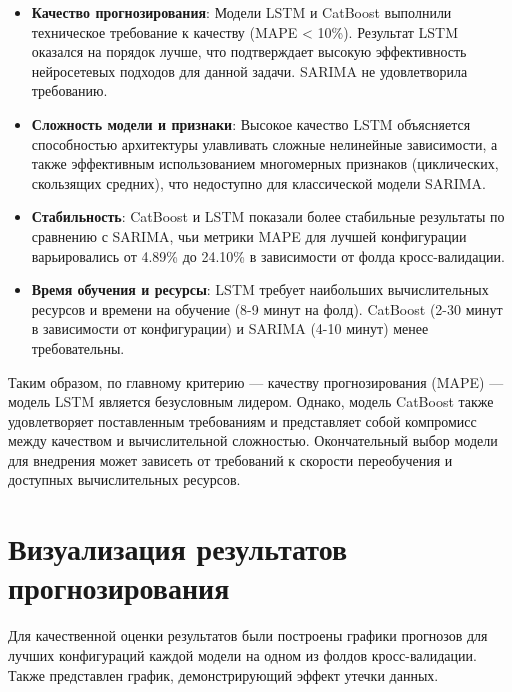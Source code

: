 \begin{itemize}
    \item \textbf{Качество прогнозирования}: Модели LSTM и CatBoost выполнили техническое требование к качеству (MAPE < 10\%). Результат LSTM оказался на порядок лучше, что подтверждает высокую эффективность нейросетевых подходов для данной задачи. SARIMA не удовлетворила требованию.
    
    \item \textbf{Сложность модели и признаки}: Высокое качество LSTM объясняется способностью архитектуры улавливать сложные нелинейные зависимости, а также эффективным использованием многомерных признаков (циклических, скользящих средних), что недоступно для классической модели SARIMA.
    
    \item \textbf{Стабильность}: CatBoost и LSTM показали более стабильные результаты по сравнению с SARIMA, чьи метрики MAPE для лучшей конфигурации варьировались от 4.89\% до 24.10\% в зависимости от фолда кросс-валидации.
    
    \item \textbf{Время обучения и ресурсы}: LSTM требует наибольших вычислительных ресурсов и времени на обучение (8-9 минут на фолд). CatBoost (2-30 минут в зависимости от конфигурации) и SARIMA (4-10 минут) менее требовательны.
\end{itemize}

\hspace*{1.25cm}Таким образом, по главному критерию — качеству прогнозирования (MAPE) — модель LSTM является безусловным лидером. Однако, модель CatBoost также удовлетворяет поставленным требованиям и представляет собой компромисс между качеством и вычислительной сложностью. Окончательный выбор модели для внедрения может зависеть от требований к скорости переобучения и доступных вычислительных ресурсов.

\section{Визуализация результатов прогнозирования}
\label{sec:viz_results}

\hspace*{1.25cm}Для качественной оценки результатов были построены графики прогнозов для лучших конфигураций каждой модели на одном из фолдов кросс-валидации. Также представлен график, демонстрирующий эффект утечки данных.

